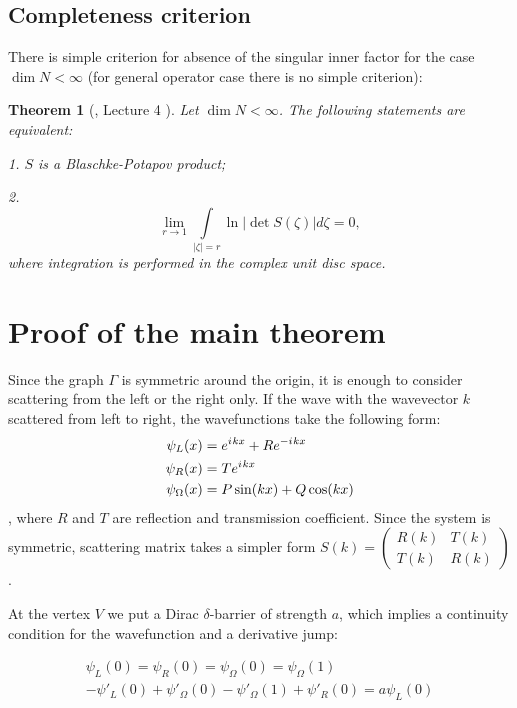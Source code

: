 \documentclass{birkjour}
\newtheorem{thm}{Theorem}[section]
\theoremstyle{definition}
\theoremstyle{remark}
\numberwithin{equation}{section}
\newcommand{\eexp}[1]{e^{#1}}
\newcommand{\iu}{{i\mkern1mu}}
\begin{document}
\subsection{Completeness criterion}
There is simple criterion for absence of the singular inner factor
for the case  $\dim  N < \infty$ (for general operator case there
is no simple criterion):

\begin{thm}[\cite{Nik}, Lecture 4 ] Let $\dim  N < \infty$. The following
statements are equivalent:

1.  $S$ is a Blaschke-Potapov  product;

2. \begin{equation}\label{eq:crit}\lim\limits_{r \to 1} \int\limits_{\left|\zeta\right| = r} \ln \left|\det S(\zeta)\right| d \zeta = 0,
\end{equation}
where integration is performed in the complex unit disc space.
\end{thm}

\section{Proof of the main theorem}

Since the graph $\Gamma$ is symmetric around the origin, it is enough to consider scattering from the left or the right only. If the wave with the wavevector $k$ scattered from left to right, the wavefunctions take the following form:
\begin{align*}
\psi_L(x) &= \eexp{\iu k x} + R \eexp{-\iu k x} \\
\psi_R(x) &= T \eexp{\iu k x}\\
\psi_\Omega(x) &= P \sin(k x) + Q \cos(k x)
\end{align*}
, where $R$ and $T$ are reflection and transmission coefficient. Since the system is symmetric, scattering matrix takes a simpler form
$S(k) = \begin{pmatrix} R(k) & T(k) \\ T(k) & R(k) \end{pmatrix}$.

At the vertex $V$ we put a Dirac $\delta$-barrier of strength $a$, which implies a continuity condition for the wavefunction and a derivative jump:

\begin{align*}
\psi_L(0) = \psi_R(0) = \psi_\Omega(0) = \psi_\Omega(1) \\ 
-\psi'_L(0) + \psi'_\Omega(0) - \psi'_\Omega(1) + \psi'_R(0) = a \psi_L(0)
\end{align*}
\end{document}
